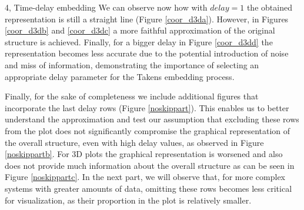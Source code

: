 \begin{task}{4, Time-delay embedding}
We can observe now how with \(delay = 1\) the obtained representation is still a straight line (Figure \ref{coor_d3da}). However, in Figures \ref{coor_d3db} and \ref{coor_d3dc} a more faithful approximation of the original structure is achieved. Finally, for a bigger delay in Figure \ref{coor_d3dd} the representation becomes less accurate due to the potential introduction of noise and miss of information, demonstrating the importance of selecting an appropriate delay parameter for the Takens embedding process.

Finally, for the sake of completeness we include additional figures that incorporate the last delay rows (Figure \ref{noskippart}). This enables us to better understand the approximation and test our assumption that excluding these rows from the plot does not significantly compromise the graphical representation of the overall structure, even with high delay values, as observed in Figure \ref{noskippartb}. For 3D plots the graphical representation is worsened and also does not provide much information about the overall structure as can be seen in Figure \ref{noskippartc}. In the next part, we will observe that, for more complex systems with greater amounts of data, omitting these rows becomes less critical for visualization, as their proportion in the plot is relatively smaller.
\begin{figure}[H]
\centering
{}

\end{figure}
\end{task}
